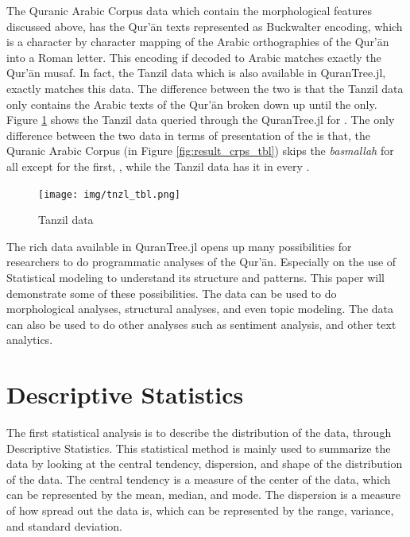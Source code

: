 The Quranic Arabic Corpus data which contain the morphological features discussed above, has the Qur'\=an texts represented as Buckwalter encoding, which is a character by character mapping of the Arabic orthographies of the Qur'\=an into a Roman letter. This encoding if decoded to Arabic matches exactly the Qur'\=an musaf. In fact, the Tanzil data which is also available in QuranTree.jl, exactly matches this data. The difference between the two is that the Tanzil data only contains the Arabic texts of the Qur'\=an broken down up until the   only. Figure \ref{fig:result_tnzl_tbl} shows the Tanzil data queried through the QuranTree.jl for  . The only difference between the two data in terms of presentation of the   is that, the Quranic Arabic Corpus (in Figure \ref{fig:result_crps_tbl}) skips the \textit{basmallah} for all   except for the first,  , while the Tanzil data has it in every  .

\begin{figure}[!t]
    \centering
    \texttt{[image: img/tnzl\_tbl.png]}
    \caption{  Tanzil data}
    \label{fig:result_tnzl_tbl}
\end{figure}

The rich data available in QuranTree.jl opens up many possibilities for researchers to do programmatic analyses of the Qur'\=an. Especially on the use of Statistical modeling to understand its structure and patterns. This paper will demonstrate some of these possibilities. The data can be used to do morphological analyses, structural analyses, and even topic modeling. The data can also be used to do other analyses such as sentiment analysis, and other text analytics. 

\section{Descriptive Statistics}\label{sec:ch4_desc_stat}
The first statistical analysis is to describe the distribution of the data, through Descriptive Statistics. This statistical method is mainly used to summarize the data by looking at the central tendency, dispersion, and shape of the distribution of the data. The central tendency is a measure of the center of the data, which can be represented by the mean, median, and mode. The dispersion is a measure of how spread out the data is, which can be represented by the range, variance, and standard deviation.

